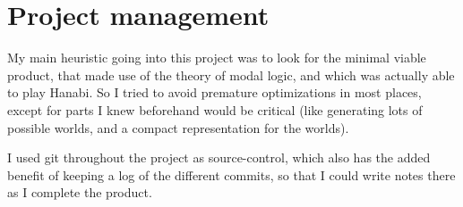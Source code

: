 \section{Project management}

My main heuristic going into this project was to look for the minimal viable product, that made use of the theory of modal logic, and which was actually able to play Hanabi.
So I tried to avoid premature optimizations in most places, except for parts I knew beforehand would be critical (like generating lots of possible worlds, and a compact representation for the worlds). 

I used git throughout the project as source-control, which also has the added benefit of keeping a log of the different commits, so that I could write notes there as I complete the product.

